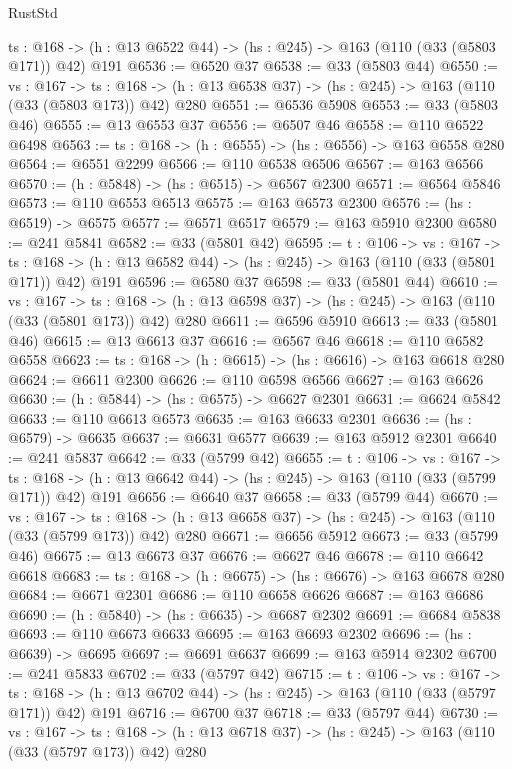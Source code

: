 \begin{lexlean}{RustStd}
\begin{coremodule}
  {ts : @168} -> (h : @13 @6522 @44) -> (hs : @245) -> @163 (@110 (@33 (@5803 @171)) @42) @191
@6536 := @6520 @37
@6538 := @33 (@5803 @44)
@6550 := {vs : @167} ->
  {ts : @168} -> (h : @13 @6538 @37) -> (hs : @245) -> @163 (@110 (@33 (@5803 @173)) @42) @280
@6551 := @6536 @5908
@6553 := @33 (@5803 @46)
@6555 := @13 @6553 @37
@6556 := @6507 @46
@6558 := @110 @6522 @6498
@6563 := {ts : @168} -> (h : @6555) -> (hs : @6556) -> @163 @6558 @280
@6564 := @6551 @2299
@6566 := @110 @6538 @6506
@6567 := @163 @6566
@6570 := (h : @5848) -> (hs : @6515) -> @6567 @2300
@6571 := @6564 @5846
@6573 := @110 @6553 @6513
@6575 := @163 @6573 @2300
@6576 := (hs : @6519) -> @6575
@6577 := @6571 @6517
@6579 := @163 @5910 @2300
@6580 := @241 @5841
@6582 := @33 (@5801 @42)
@6595 := {t : @106} ->
  {vs : @167} ->
  {ts : @168} -> (h : @13 @6582 @44) -> (hs : @245) -> @163 (@110 (@33 (@5801 @171)) @42) @191
@6596 := @6580 @37
@6598 := @33 (@5801 @44)
@6610 := {vs : @167} ->
  {ts : @168} -> (h : @13 @6598 @37) -> (hs : @245) -> @163 (@110 (@33 (@5801 @173)) @42) @280
@6611 := @6596 @5910
@6613 := @33 (@5801 @46)
@6615 := @13 @6613 @37
@6616 := @6567 @46
@6618 := @110 @6582 @6558
@6623 := {ts : @168} -> (h : @6615) -> (hs : @6616) -> @163 @6618 @280
@6624 := @6611 @2300
@6626 := @110 @6598 @6566
@6627 := @163 @6626
@6630 := (h : @5844) -> (hs : @6575) -> @6627 @2301
@6631 := @6624 @5842
@6633 := @110 @6613 @6573
@6635 := @163 @6633 @2301
@6636 := (hs : @6579) -> @6635
@6637 := @6631 @6577
@6639 := @163 @5912 @2301
@6640 := @241 @5837
@6642 := @33 (@5799 @42)
@6655 := {t : @106} ->
  {vs : @167} ->
  {ts : @168} -> (h : @13 @6642 @44) -> (hs : @245) -> @163 (@110 (@33 (@5799 @171)) @42) @191
@6656 := @6640 @37
@6658 := @33 (@5799 @44)
@6670 := {vs : @167} ->
  {ts : @168} -> (h : @13 @6658 @37) -> (hs : @245) -> @163 (@110 (@33 (@5799 @173)) @42) @280
@6671 := @6656 @5912
@6673 := @33 (@5799 @46)
@6675 := @13 @6673 @37
@6676 := @6627 @46
@6678 := @110 @6642 @6618
@6683 := {ts : @168} -> (h : @6675) -> (hs : @6676) -> @163 @6678 @280
@6684 := @6671 @2301
@6686 := @110 @6658 @6626
@6687 := @163 @6686
@6690 := (h : @5840) -> (hs : @6635) -> @6687 @2302
@6691 := @6684 @5838
@6693 := @110 @6673 @6633
@6695 := @163 @6693 @2302
@6696 := (hs : @6639) -> @6695
@6697 := @6691 @6637
@6699 := @163 @5914 @2302
@6700 := @241 @5833
@6702 := @33 (@5797 @42)
@6715 := {t : @106} ->
  {vs : @167} ->
  {ts : @168} -> (h : @13 @6702 @44) -> (hs : @245) -> @163 (@110 (@33 (@5797 @171)) @42) @191
@6716 := @6700 @37
@6718 := @33 (@5797 @44)
@6730 := {vs : @167} ->
  {ts : @168} -> (h : @13 @6718 @37) -> (hs : @245) -> @163 (@110 (@33 (@5797 @173)) @42) @280

\end{coremodule}
\end{lexlean}
